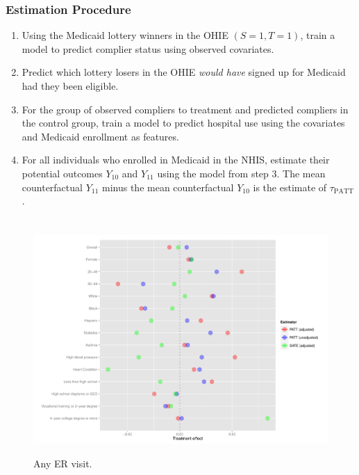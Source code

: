 \documentclass{beamer}
\begin{document}
\begin{frame} %
\frametitle{Estimation Procedure}
\begin{enumerate}
\item Using the Medicaid lottery winners in the OHIE $(S=1, T=1)$, train a model to predict complier status using observed covariates.
\item Predict which lottery losers in the OHIE \textit{would have} signed up for Medicaid had they been eligible.
\item For the group of observed compliers to treatment and predicted compliers in the control group, train a model to predict hospital use using the covariates and Medicaid enrollment as features. 
\item For all individuals who enrolled in Medicaid in the NHIS, estimate their potential outcomes $Y_{10}$ and $Y_{11}$ using the model from step 3.  The mean counterfactual $Y_{11}$ minus the mean counterfactual $Y_{10}$ is the estimate of $\tau_{\text{PATT}}$.
\end{enumerate}
\end{frame}



\section[Results]{}

\begin{frame}
\begin{figure}[htbp]
\begin{center}
       \caption{Any ER visit.}
   \includegraphics[scale=0.35]{../paper/any-visit-plot.pdf} 
   \label{het-plot-av}
   \end{center}
\end{figure}
\end{frame}
\end{document}
